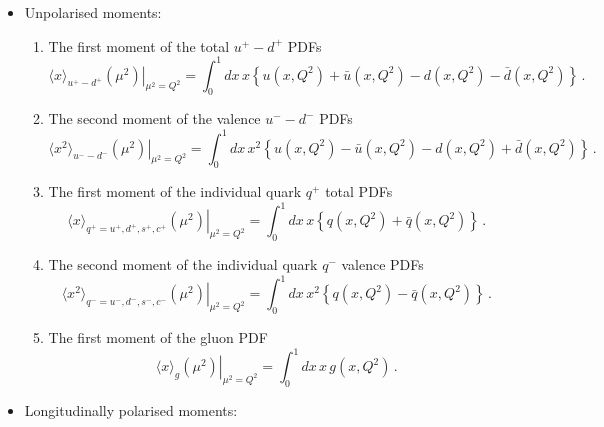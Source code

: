 \begin{itemize}

\item Unpolarised moments:

\begin{enumerate}

\item The first moment of the total $u^+-d^+$ PDFs
\begin{equation}
\left.\langle x\rangle_{u^+-d^+}(\mu^2)\right|_{\mu^2=Q^2}
=
\int_0^1 dx\, x\left\{u(x,Q^2)+\bar{u}(x,Q^2)-d(x,Q^2)-\bar{d}(x,Q^2)\right\} \, .
\label{eq:unpfmumdtot}
\end{equation}

\item The second moment of the valence $u^--d^-$ PDFs
\begin{equation}
\left.\langle x^2\rangle_{u^--d^-}(\mu^2)\right|_{\mu^2=Q^2}
=
\int_0^1 dx\, x^2\left\{u(x,Q^2)-\bar{u}(x,Q^2)-d(x,Q^2)+\bar{d}(x,Q^2)\right\} \, .
\label{eq:unpsmumdval}  
\end{equation}

\item The first moment of the individual quark $q^+$ total PDFs
\begin{equation}
\left.\langle x\rangle_{q^+=u^+,d^+,s^+,c^+}(\mu^2)\right|_{\mu^2=Q^2}
=
\int_0^1 dx\, x\left\{q(x,Q^2)+\bar{q}(x,Q^2)\right\} \, .
\label{eq:unpfmiqtot}
\end{equation}

\item The second moment of the individual quark $q^-$ valence PDFs
\begin{equation}
\left.\langle x^2\rangle_{q^-=u^-,d^-,s^-,c^-}(\mu^2)\right|_{\mu^2=Q^2}
=
\int_0^1 dx\, x^2\left\{q(x,Q^2)-\bar{q}(x,Q^2)\right\} \, .
\label{eq:unpsmiqval}
\end{equation}

\item The first moment of the gluon PDF
\begin{equation}
\left.\langle x \rangle_g(\mu^2)\right|_{\mu^2=Q^2}
=
\int_0^1 dx\, x\, g(x,Q^2) \, .
\label{eq:unpfmg}
\end{equation}

\end{enumerate}

\item Longitudinally polarised moments:

\begin{enumerate}


\end{enumerate}
\end{itemize}
